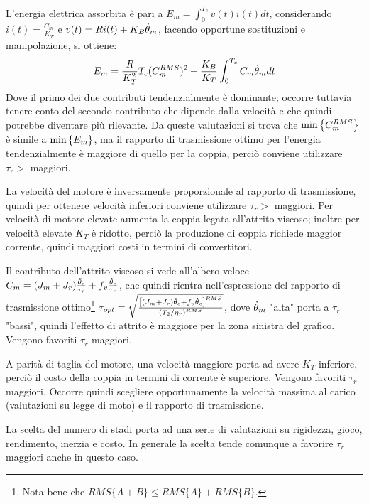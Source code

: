 L'energia elettrica assorbita è pari a \(E_m = \int^{T_c}_0 v(t) i(t) dt\),  considerando \(i(t)=\frac{C_m}{K_T}\) e \(v(t) = R i(t) + K_B \dot{\theta}_m\), facendo opportune sostituzioni e manipolazione, si ottiene:
\[ E_m = \frac{R}{K_T^2} T_c (C^{RMS}_m)^2 + \frac{K_B}{K_T} \int^{T_c}_0 C_m\dot{\theta}_m dt \]
Dove il primo dei due contributi tendenzialmente è dominante; occorre tuttavia tenere conto del secondo contributo che dipende dalla velocità e che quindi potrebbe diventare più rilevante.
Da queste valutazioni si trova che \(\operatorname{min}\left\{ C_m^{RMS} \right\}\) è simile a \(\operatorname{min}\left\{ E_m \right\}\), ma il rapporto di trasmissione ottimo per l'energia tendenzialmente è maggiore di quello per la coppia, perciò conviene utilizzare \(\tau_r >\) maggiori.

La velocità del motore è inversamente proporzionale al rapporto di trasmissione, quindi per ottenere velocità inferiori conviene utilizzare \(\tau_r >\) maggiori.
Per velocità di motore elevate aumenta la coppia legata all'attrito viscoso; inoltre per velocità elevate \(K_T\) è ridotto, perciò la produzione di coppia richiede maggior corrente, quindi maggiori costi in termini di convertitori.

Il contributo dell'attrito viscoso si vede all'albero veloce \(C_m = (J_m+J_r)\frac{\Ddot{\theta}_c}{\tau_r} + f_v \frac{\dot{\theta}_c}{\tau_r}\), che quindi rientra nell'espressione del rapporto di trasmissione ottimo\footnote{Nota bene che \(RMS\{A+B\}\leqslant RMS\{A\} +RMS\{B\}\).} \(\tau_{opt} = \sqrt{\frac{\left[(J_m + J_r)\Ddot{\theta}_c+f_v \dot{\theta}_c\right]^{RMS}}{\left(T_2/\eta_r\right)^{RMS}}}\), dove \(\dot{\theta}_m\) "alta" porta a \(\tau_r\) "bassi", quindi l'effetto di attrito è maggiore per la zona sinistra del grafico. Vengono favoriti \(\tau_r\) maggiori.

A parità di taglia del motore, una velocità maggiore porta ad avere \(K_T\) inferiore, perciò il costo della coppia in termini di corrente è superiore. Vengono favoriti \(\tau_r\) maggiori.
Occorre quindi scegliere opportunamente la velocità massima al carico (valutazioni su legge di moto) e il rapporto di trasmissione.

La scelta del numero di stadi porta ad una serie di valutazioni su rigidezza, gioco, rendimento, inerzia e costo.
In generale la scelta tende comunque a favorire \(\tau_r\) maggiori anche in questo caso.


